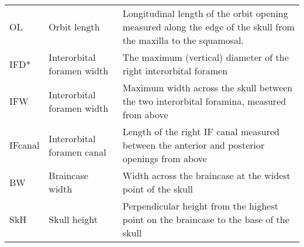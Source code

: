 \begin{tabular}{lp{3.5cm}p{9.75cm}}
OL & Orbit length & Longitudinal length of the orbit opening measured along the edge of the skull from the maxilla to the squamosal. \\
IFD* & Interorbital foramen width & The maximum (vertical) diameter of the right interorbital foramen\\
IFW & Interorbital foramen width & Maximum width across the skull between the two interorbital foramina, measured from above\\
IFcanal & Interorbital foramen canal & Length of the right IF canal measured between the anterior and posterior openings from above\\
BW & Braincase width & Width across the braincase at the widest point of the skull\\
SkH & Skull height & Perpendicular height from the highest point on the braincase to the base of the skull\\



\hline
\end{tabular}